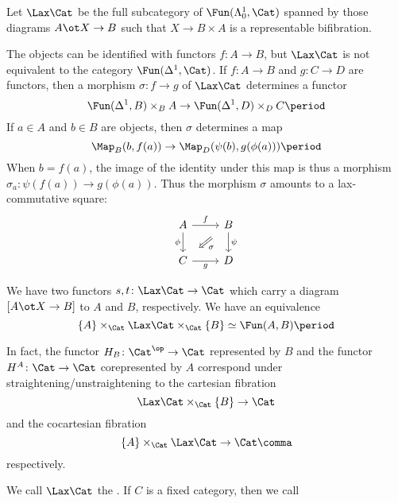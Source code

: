 \begin{construction}
	Let $ \Lax\Cat $ be the full subcategory
	of $ \Fun(\Lambda^1_0, \Cat ) $
	spanned by those diagrams $ A \ot X \to B $
	such that $ X \to B \times A $ is a representable bifibration.

	The objects can be identified with functors $ f \colon A \to B $,
	but $ \Lax\Cat $ is not equivalent to 
	the category $ \Fun(\Delta^1, \Cat) $.
	If $ f \colon A \to B $ and $ g \colon C \to D $
	are functors, then
	a morphism $ \sigma \colon f \to g $ of $ \Lax\Cat $
	determines a functor
	\[
		\Fun(\Delta^1, B) \times_B A \to
		\Fun(\Delta^1, D) \times_D C \period
	\]
	If $ a \in A $ and $ b \in B $ are objects,
	then $ \sigma $ determines a map
	\[
		\Map_B(b, f(a)) \to \Map_D(\psi(b), g(\phi(a))) \period
	\]
	When $ b = f(a) $,
	the image of the identity under this map
	is thus a morphism $ \sigma_a \colon \psi(f(a)) \to g(\phi(a)) $.
	Thus the morphism $ \sigma $ amounts to a lax-commutative square:
	\begin{equation}\label{square:laxsquare}
		\begin{tikzcd}
			A \arrow[r, "f" above]
			  \arrow[d, "\phi" left]
			  & B \arrow[d, "\psi" right]
			      \arrow[dl, phantom, "\scriptstyle \sigma"
			      below right, "\Longleftarrow" sloped] \\ 
			C \arrow[r, "g" below] & D
		\end{tikzcd}
	\end{equation}

	We have two functors
	$ s, t \colon \Lax\Cat \to \Cat $
	which carry a diagram $ [ A \ot X \to B ] $
	to $ A $ and $ B $, respectively.
	We have an equivalence
	\[
		\{A\} \times_{\Cat} \Lax\Cat \times_{\Cat} \{B\}
		\simeq \Fun(A,B) \period
	\]

	In fact, the functor
	$ H_B \colon \Cat^{\op} \to \Cat $
	represented by $ B $
	and the functor
	$ H^A \colon \Cat \to \Cat $
	corepresented by $ A $
	correspond under straightening/unstraightening
	to the cartesian fibration
	\[
		\Lax\Cat \times_{\Cat} \{B\} \to \Cat
	\]
	and the cocartesian fibration
	\[
		\{A\} \times_{\Cat} \Lax\Cat \to \Cat \comma
	\]
	respectively.
\end{construction}

\begin{definition}
	We call $ \Lax\Cat $ the .
	If $ C $ is a fixed category,
	then we call 
\end{definition}

